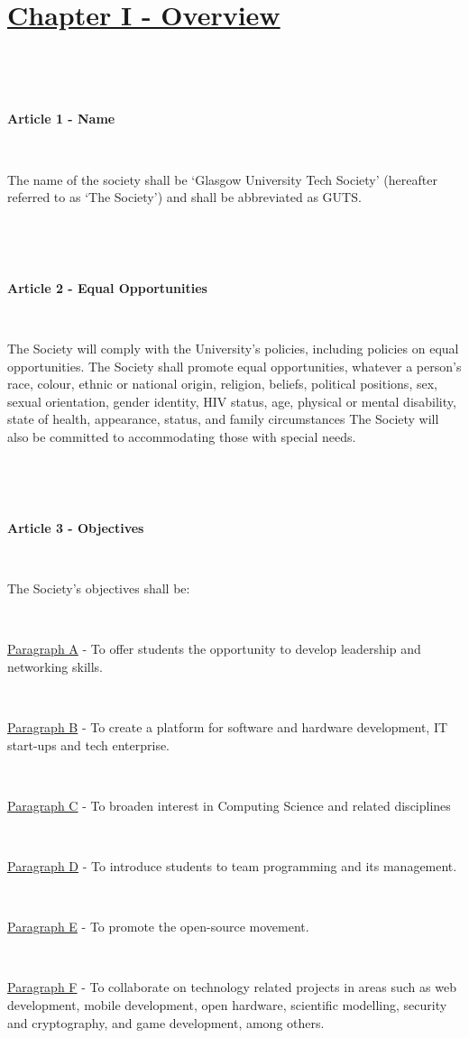 \section{\underline{Chapter I - Overview}}

~

~

\large{\textbf{Article 1 - Name}}

~

The name of the society shall be `Glasgow University Tech Society'
(hereafter referred to as `The Society') and shall be abbreviated as
GUTS.

~

~

\large{\textbf{Article 2 - Equal Opportunities}}

~

The Society will comply with the University's policies, including
policies on equal opportunities.
The Society shall promote equal opportunities, whatever a person's race, colour, ethnic or national origin, religion, beliefs, political positions, sex, sexual orientation, gender identity, HIV status, age, physical or mental disability, state of health, appearance, status, and family circumstances 
The Society will also be committed to accommodating those with special
needs.

~

~

\large{\textbf{Article 3 - Objectives}}

~

The Society's objectives shall be:

~

\underline{Paragraph A} - To offer students the opportunity to develop
leadership and networking skills.

~

\underline{Paragraph B} - To create a platform for software and hardware
development, IT start-ups and tech enterprise.

~

\underline{Paragraph C} - To broaden interest in Computing Science and
related disciplines

~

\underline{Paragraph D} - To introduce students to team programming and
its management.

~

\underline{Paragraph E} - To promote the open-source movement.

~

\underline{Paragraph F} - To collaborate on technology related projects
in areas such as web development, mobile development, open hardware,
scientific modelling, security and cryptography, and game development,
among others.

